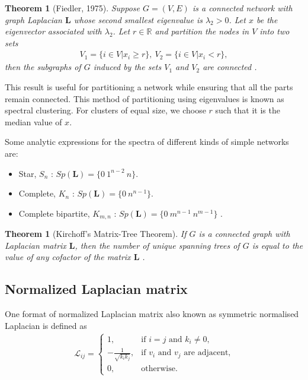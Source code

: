 \documentclass[10pt,a4paper]{article}
\theoremstyle{plain}
\newtheorem{thm}[subsection]{Theorem}
\theoremstyle{definition}
\begin{document}
\begin{thm}[Fiedler, 1975]
	Suppose $G = (V,E)$ is a connected network with graph Laplacian $\mathbf{L}$ whose second smallest eigenvalue is $\lambda_2 > 0$. Let $x$ be the eigenvector associated with $\lambda_2$. Let $r \in \mathbb{R}$ and partition the nodes in $V$ into two sets
	\begin{eqnarray}
	V_1 = \{i \in V|x_i \geq r\}, ~ V_2 = \{i \in V | x_i < r\}, 
	\end{eqnarray}
	then the subgraphs of $G$ induced by the sets $V_1$ and $V_2$ are connected \citep{estrada2015first}.
	\label{fiedler}\\
\end{thm}
This result is useful for partitioning a network while ensuring that all the parts remain connected. This method of partitioning using eigenvalues is known as spectral clustering. For clusters of equal size, we choose $r$ such that it is the median value of $x$. 


Some analytic expressions for the spectra of different kinds of simple networks are:
\begin{itemize}
	\item Star, $S_n$ : $Sp(\mathbf{L}) = \{ 0~ 1^{n-2}~n\}$. 
	
	\item Complete, $K_n$ : $Sp(\mathbf{L}) = \{ 0~ n^{n-1} \}$. 
	
	\item Complete bipartite, $K_{m,n}$ : $Sp(\mathbf{L}) =\{ 0 ~ m^{n-1} ~ n^{m-1}\}$ \citep{estrada2011structure}.\\
	
\end{itemize}

\begin{thm}[Kirchoff's Matrix-Tree Theorem]
	If $G$ is a connected graph with Laplacian matrix $\mathbf{L}$, then the number of unique spanning trees of $G$ is equal to the value of any cofactor of the matrix $\mathbf{L}$ \citep{harris2008combinatorics}.
	\label{thm:kirchoff}
\end{thm}

\subsection{Normalized Laplacian matrix}
One format of normalized Laplacian matrix also known as symmetric normalised Laplacian is defined as 
\begin{eqnarray*}
	\mathcal{L}_{ij} = \begin{cases} 1, &\mbox{if } i = j \text{ and } k_i \neq  0, \\
		- \frac{1}{\sqrt{k_i k_j}}, &\mbox{if } v_i \text{ and } v_j \text{ are adjacent,} \\ 
		0, & \text{otherwise}.
	\end{cases}
\end{eqnarray*}
\end{document}
